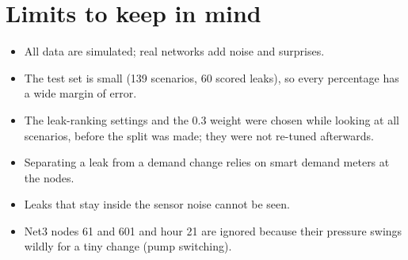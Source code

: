 \documentclass[11pt,a4paper]{article}
\begin{document}
\section{Limits to keep in mind}
\begin{itemize}[leftmargin=*,itemsep=2pt]
\item All data are simulated; real networks add noise and surprises.
\item The test set is small (139 scenarios, 60 scored leaks), so every percentage has a wide margin of error.
\item The leak-ranking settings and the 0.3 weight were chosen while looking at all scenarios, before the split was made; they were not re-tuned afterwards.
\item Separating a leak from a demand change relies on smart demand meters at the nodes.
\item Leaks that stay inside the sensor noise cannot be seen.
\item Net3 nodes 61 and 601 and hour 21 are ignored because their pressure swings wildly for a tiny change (pump switching).
\end{itemize}
\end{document}
